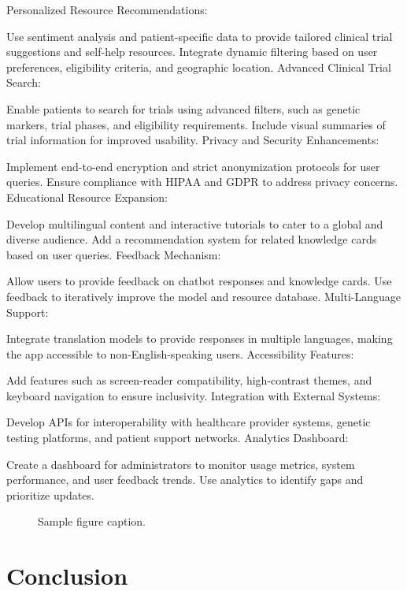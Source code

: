 \documentclass{article} %
\begin{document}
Personalized Resource Recommendations:

Use sentiment analysis and patient-specific data to provide tailored clinical trial suggestions and self-help resources.
Integrate dynamic filtering based on user preferences, eligibility criteria, and geographic location.
Advanced Clinical Trial Search:

Enable patients to search for trials using advanced filters, such as genetic markers, trial phases, and eligibility requirements.
Include visual summaries of trial information for improved usability.
Privacy and Security Enhancements:

Implement end-to-end encryption and strict anonymization protocols for user queries.
Ensure compliance with HIPAA and GDPR to address privacy concerns.
Educational Resource Expansion:

Develop multilingual content and interactive tutorials to cater to a global and diverse audience.
Add a recommendation system for related knowledge cards based on user queries.
Feedback Mechanism:

Allow users to provide feedback on chatbot responses and knowledge cards.
Use feedback to iteratively improve the model and resource database.
Multi-Language Support:

Integrate translation models to provide responses in multiple languages, making the app accessible to non-English-speaking users.
Accessibility Features:

Add features such as screen-reader compatibility, high-contrast themes, and keyboard navigation to ensure inclusivity.
Integration with External Systems:

Develop APIs for interoperability with healthcare provider systems, genetic testing platforms, and patient support networks.
Analytics Dashboard:

Create a dashboard for administrators to monitor usage metrics, system performance, and user feedback trends.
Use analytics to identify gaps and prioritize updates.



\begin{figure}[h]
\begin{center}
\fbox{\rule[-.5cm]{0cm}{4cm} \rule[-.5cm]{4cm}{0cm}}
\end{center}
\caption{Sample figure caption.}
\end{figure}

\section{Conclusion}
\end{document}
